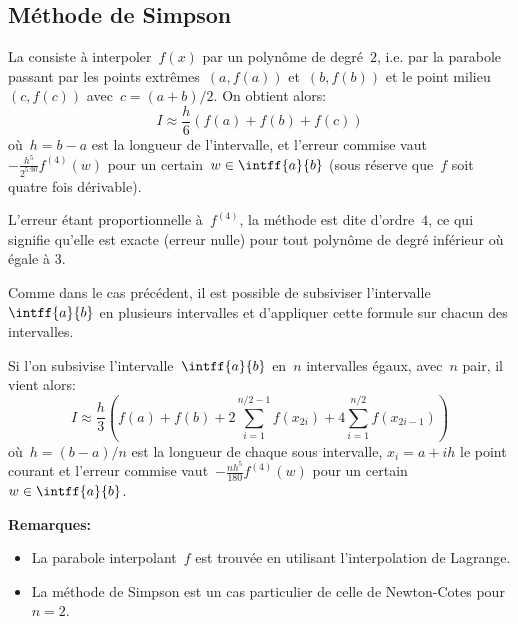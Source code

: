 \medskip
\subsection*{Méthode de Simpson}

La  consiste à interpoler~$f(x)$ par un polynôme 
de degré~$2$, i.e. par la parabole passant par les points extrêmes~$(a,f(a))$ et~$(b,f(b))$ 
et le point milieu~$(c,f(c))$ avec~$c=(a+b)/2$.
On obtient alors:
\begin{equation} I\approx \frac{h}{6} \left( f(a)+f(b)+f(c)\right)\end{equation}
où~$h=b-a$ est la longueur de l'intervalle,
et l'erreur commise vaut~$-\frac{h^5}{2^5.90} f^{(4)}(w)$ pour un certain~$w\in\intff{a}{b}$
(sous réserve que~$f$ soit quatre fois dérivable).

L'erreur étant proportionnelle à~$f^{(4)}$, la méthode est dite d'ordre~$4$, ce qui
signifie qu'elle est exacte (erreur nulle) pour tout polynôme de degré inférieur
où égale à 3.

\medskip
Comme dans le cas précédent, il est possible de subsiviser l'intervalle~$\intff{a}{b}$ en plusieurs intervalles 
et d'appliquer cette formule sur chacun des intervalles.

Si l'on subsivise l'intervalle~$\intff{a}{b}$ en~$n$ intervalles égaux, avec~$n$ pair, il vient alors:
\begin{equation} I\approx \frac{h}{3} \left( f(a)+f(b)+2\sum_{i=1}^{n/2-1}f(x_{2i})+4\sum_{i=1}^{n/2}f(x_{2i-1})
\right)\end{equation}
où~$h=(b-a)/n$ est la longueur de chaque sous intervalle, $x_i=a+ih$ le
point courant et l'erreur commise vaut~$-\frac{nh^5}{180} f^{(4)}(w)$ pour un certain~$w\in\intff{a}{b}$.

\medskip
\textbf{Remarques:}
\begin{itemize}
\item La parabole interpolant~$f$ est trouvée en utilisant l'interpolation de Lagrange.
\item La méthode de Simpson est un cas particulier de 
	celle de Newton-Cotes pour~$n=2$.
\end{itemize}


